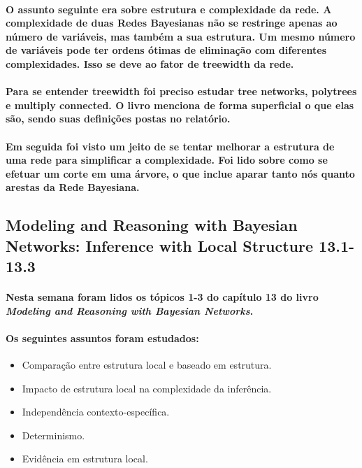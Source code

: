 \documentclass[a4paper,10pt]{article}
\theoremstyle{plain}
\begin{document}
\paragraph{
  O assunto seguinte era sobre estrutura e complexidade da rede. A complexidade de duas Redes
  Bayesianas não se restringe apenas ao número de variáveis, mas também a sua estrutura. Um mesmo
  número de variáveis pode ter ordens ótimas de eliminação com diferentes complexidades. Isso se
  deve ao fator de treewidth da rede.
}

\paragraph{
  Para se entender treewidth foi preciso estudar tree networks, polytrees e multiply connected. O
  livro menciona de forma superficial o que elas são, sendo suas definições postas no relatório.
}

\paragraph{
  Em seguida foi visto um jeito de se tentar melhorar a estrutura de uma rede para simplificar a
  complexidade. Foi lido sobre como se efetuar um corte em uma árvore, o que inclue aparar tanto
  nós quanto arestas da Rede Bayesiana.
}

\subsection{Modeling and Reasoning with Bayesian Networks: Inference with Local Structure 13.1-13.3}

\paragraph{
  Nesta semana foram lidos os tópicos 1-3 do capítulo 13 do livro \textit{Modeling and Reasoning
  with Bayesian Networks}\cite{bayes-net-darwiche}.
}

\paragraph{
  Os seguintes assuntos foram estudados:
}

\begin{itemize}
  \item Comparação entre estrutura local e baseado em estrutura.
  \item Impacto de estrutura local na complexidade da inferência.
  \item Independência contexto-específica.
  \item Determinismo.
  \item Evidência em estrutura local.
\end{itemize}
\end{document}
